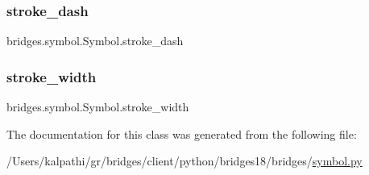 \subsubsection{\texorpdfstring{stroke\+\_\+dash}{stroke\_dash}}
{\footnotesize\ttfamily bridges.\+symbol.\+Symbol.\+stroke\+\_\+dash}

\mbox{\label{classbridges_1_1symbol_1_1_symbol_a413998c84c07b9d76402c250579b5023}} 
\subsubsection{\texorpdfstring{stroke\+\_\+width}{stroke\_width}}
{\footnotesize\ttfamily bridges.\+symbol.\+Symbol.\+stroke\+\_\+width}



The documentation for this class was generated from the following file\+:\begin{DoxyCompactItemize}
\item 
/\+Users/kalpathi/gr/bridges/client/python/bridges18/bridges/\mbox{\hyperlink{symbol_8py}{symbol.\+py}}\end{DoxyCompactItemize}
